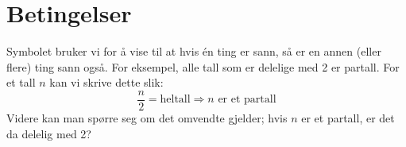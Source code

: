 \section{Betingelser}
Symbolet \sym{$ \Rightarrow $} bruker vi for å vise til at hvis én ting er sann, så er en annen (eller flere) ting sann også. For eksempel, alle tall som er delelige med 2 er partall. For et tall $ n $ kan vi skrive dette slik:
\[ \frac{n}{2}=\text{heltall} \Rightarrow  n\text{ er et partall} \]
Videre kan man spørre seg om det omvendte gjelder; hvis $ n $ er et partall, er det da delelig med 2?
